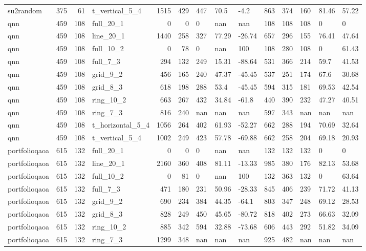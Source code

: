 \begin{longtable}{lrrlrrlllrrlll}
su2random & 375 & 61 & t\_vertical\_5\_4 & 1515 & 429 & 447 & 70.5 & -4.2 & 863 & 374 & 160 & 81.46 & 57.22 \\
qnn & 459 & 108 & full\_20\_1 & 0 & 0 & 0 & nan & nan & 108 & 108 & 108 & 0 & 0 \\
qnn & 459 & 108 & line\_20\_1 & 1440 & 258 & 327 & 77.29 & -26.74 & 657 & 296 & 155 & 76.41 & 47.64 \\
qnn & 459 & 108 & full\_10\_2 & 0 & 78 & 0 & nan & 100 & 108 & 280 & 108 & 0 & 61.43 \\
qnn & 459 & 108 & full\_7\_3 & 294 & 132 & 249 & 15.31 & -88.64 & 531 & 366 & 214 & 59.7 & 41.53 \\
qnn & 459 & 108 & grid\_9\_2 & 456 & 165 & 240 & 47.37 & -45.45 & 537 & 251 & 174 & 67.6 & 30.68 \\
qnn & 459 & 108 & grid\_8\_3 & 618 & 198 & 288 & 53.4 & -45.45 & 594 & 315 & 181 & 69.53 & 42.54 \\
qnn & 459 & 108 & ring\_10\_2 & 663 & 267 & 432 & 34.84 & -61.8 & 440 & 390 & 232 & 47.27 & 40.51 \\
qnn & 459 & 108 & ring\_7\_3 & 816 & 240 & nan & nan & nan & 597 & 343 & nan & nan & nan \\
qnn & 459 & 108 & t\_horizontal\_5\_4 & 1056 & 264 & 402 & 61.93 & -52.27 & 662 & 288 & 194 & 70.69 & 32.64 \\
qnn & 459 & 108 & t\_vertical\_5\_4 & 1002 & 249 & 423 & 57.78 & -69.88 & 662 & 258 & 204 & 69.18 & 20.93 \\
portfolioqaoa & 615 & 132 & full\_20\_1 & 0 & 0 & 0 & nan & nan & 132 & 132 & 132 & 0 & 0 \\
portfolioqaoa & 615 & 132 & line\_20\_1 & 2160 & 360 & 408 & 81.11 & -13.33 & 985 & 380 & 176 & 82.13 & 53.68 \\
portfolioqaoa & 615 & 132 & full\_10\_2 & 0 & 81 & 0 & nan & 100 & 132 & 363 & 132 & 0 & 63.64 \\
portfolioqaoa & 615 & 132 & full\_7\_3 & 471 & 180 & 231 & 50.96 & -28.33 & 845 & 406 & 239 & 71.72 & 41.13 \\
portfolioqaoa & 615 & 132 & grid\_9\_2 & 690 & 234 & 384 & 44.35 & -64.1 & 803 & 347 & 248 & 69.12 & 28.53 \\
portfolioqaoa & 615 & 132 & grid\_8\_3 & 828 & 249 & 450 & 45.65 & -80.72 & 818 & 402 & 273 & 66.63 & 32.09 \\
portfolioqaoa & 615 & 132 & ring\_10\_2 & 885 & 342 & 594 & 32.88 & -73.68 & 606 & 443 & 292 & 51.82 & 34.09 \\
portfolioqaoa & 615 & 132 & ring\_7\_3 & 1299 & 348 & nan & nan & nan & 925 & 482 & nan & nan & nan \\

\end{longtable}
